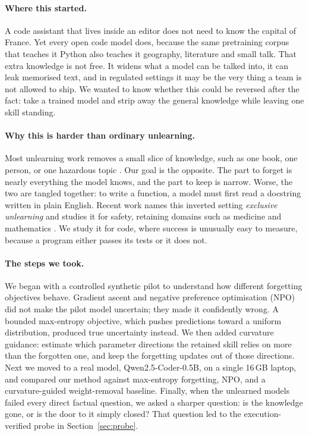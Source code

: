 \documentclass{article}
\begin{document}
\paragraph{Where this started.}
A code assistant that lives inside an editor does not need to know the capital of France. Yet every open code model does, because the same pretraining corpus that teaches it Python also teaches it geography, literature and small talk. That extra knowledge is not free. It widens what a model can be talked into, it can leak memorised text, and in regulated settings it may be the very thing a team is not allowed to ship. We wanted to know whether this could be reversed after the fact: take a trained model and strip away the general knowledge while leaving one skill standing.

\paragraph{Why this is harder than ordinary unlearning.}
Most unlearning work removes a small slice of knowledge, such as one book, one person, or one hazardous topic \citep{maini2024tofu,shi2024muse,li2024wmdp_rmu}. Our goal is the opposite. The part to forget is nearly everything the model knows, and the part to keep is narrow. Worse, the two are tangled together: to write a function, a model must first read a docstring written in plain English. Recent work names this inverted setting \emph{exclusive unlearning} and studies it for safety, retaining domains such as medicine and mathematics \citep{sasaki2026exclusive}. We study it for code, where success is unusually easy to measure, because a program either passes its tests or it does not.

\paragraph{The steps we took.}
We began with a controlled synthetic pilot to understand how different forgetting objectives behave. Gradient ascent and negative preference optimisation (NPO) \citep{zhang2024npo} did not make the pilot model uncertain; they made it confidently wrong. A bounded max-entropy objective, which pushes predictions toward a uniform distribution, produced true uncertainty instead. We then added curvature guidance: estimate which parameter directions the retained skill relies on more than the forgotten one, and keep the forgetting updates out of those directions. Next we moved to a real model, Qwen2.5-Coder-0.5B, on a single 16\,GB laptop, and compared our method against max-entropy forgetting, NPO, and a curvature-guided weight-removal baseline. Finally, when the unlearned models failed every direct factual question, we asked a sharper question: is the knowledge gone, or is the door to it simply closed? That question led to the execution-verified probe in Section~\ref{sec:probe}.
\end{document}
